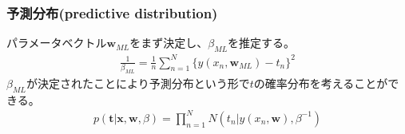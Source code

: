 \documentclass[dvipdfmx]{beamer}
\theoremstyle{definition}
\begin{document}
\begin{frame}
  \frametitle{予測分布(predictive distribution)}
  パラメータベクトル$\bm{w}_{ML}$をまず決定し、$\beta_{ML}$を推定する。
  \begin{gather*}
    \frac{1}{\beta_{ML}}=\frac{1}{n} \sum_{n=1}^{N} \{ y(x_n,\bm{w}_{ML})- t_n \}^2
  \end{gather*}
  $\beta_{ML}$が決定されたことにより予測分布という形で$t$の確率分布を考えることができる。
  \begin{gather*}
    p(\bm{t}|\bm{x},\bm{w},\beta)=\prod_{n=1}^{N} N(t_n | y(x_n,\bm{w}),\beta^{-1})
  \end{gather*}

\end{frame}

\begin{frame}
\end{frame}

\begin{frame}
  \frametitle{}
\end{frame}

\begin{frame}
  \frametitle{}
\end{frame}

\begin{frame}
  \frametitle{}
\end{frame}

\begin{frame}
  \frametitle{}
\end{frame}

\begin{frame}
  \frametitle{}
\end{frame}
\end{document}
